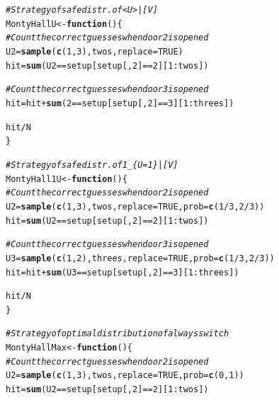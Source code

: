 \documentclass{article}\usepackage[]{graphicx}\usepackage[]{color}
\makeatletter
\newcommand{\hlnum}[1]{\textcolor[rgb]{0.686,0.059,0.569}{#1}}%
\newcommand{\hlcom}[1]{\textcolor[rgb]{0.678,0.584,0.686}{\textit{#1}}}%
\newcommand{\hlopt}[1]{\textcolor[rgb]{0,0,0}{#1}}%
\newcommand{\hlstd}[1]{\textcolor[rgb]{0.345,0.345,0.345}{#1}}%
\newcommand{\hlkwa}[1]{\textcolor[rgb]{0.161,0.373,0.58}{\textbf{#1}}}%
\newcommand{\hlkwb}[1]{\textcolor[rgb]{0.69,0.353,0.396}{#1}}%
\newcommand{\hlkwc}[1]{\textcolor[rgb]{0.333,0.667,0.333}{#1}}%
\newcommand{\hlkwd}[1]{\textcolor[rgb]{0.737,0.353,0.396}{\textbf{#1}}}%
\newenvironment{kframe}{%
 \def\at@end@of@kframe{}%
 \ifinner\ifhmode%
  \def\at@end@of@kframe{\end{minipage}}%
  \begin{minipage}{\columnwidth}%
 \fi\fi%
 \def\FrameCommand##1{\hskip\@totalleftmargin \hskip-\fboxsep
 \colorbox{shadecolor}{##1}\hskip-\fboxsep
     \hskip-\linewidth \hskip-\@totalleftmargin \hskip\columnwidth}%
 \MakeFramed {\advance\hsize-\width
   \@totalleftmargin\z@ \linewidth\hsize
   \@setminipage}}%
 {\par\unskip\endMakeFramed%
 \at@end@of@kframe}
\newenvironment{knitrout}{}{} %
\makeatother
\begin{document}
\begin{knitrout}
\color{fgcolor}\begin{kframe}
\begin{alltt}
\hlcom{# Strategy of safe distr. of <U>|[V]}
\hlstd{MontyHallU} \hlkwb{<-} \hlkwa{function} \hlstd{() \{}
  \hlcom{# Count the correct guesses when door 2 is opened}
  \hlstd{U2} \hlkwb{=} \hlkwd{sample}\hlstd{(}\hlkwd{c}\hlstd{(}\hlnum{1}\hlstd{,}\hlnum{3}\hlstd{), twos,} \hlkwc{replace} \hlstd{=} \hlnum{TRUE}\hlstd{)}
  \hlstd{hit} \hlkwb{=} \hlkwd{sum}\hlstd{(U2} \hlopt{==} \hlstd{setup[setup[,}\hlnum{2}\hlstd{]} \hlopt{==} \hlnum{2}\hlstd{][}\hlnum{1}\hlopt{:}\hlstd{twos])}

  \hlcom{# Count the correct guesses when door 3 is opened}
  \hlstd{hit} \hlkwb{=} \hlstd{hit} \hlopt{+} \hlkwd{sum}\hlstd{(}\hlnum{2} \hlopt{==} \hlstd{setup[setup[,}\hlnum{2}\hlstd{]} \hlopt{==} \hlnum{3}\hlstd{][}\hlnum{1}\hlopt{:}\hlstd{threes])}

  \hlstd{hit}\hlopt{/}\hlstd{N}
\hlstd{\}}

\hlcom{# Strategy of safe distr. of 1_\{U=1\}|[V]}
\hlstd{MontyHall1U} \hlkwb{<-} \hlkwa{function}\hlstd{() \{}
  \hlcom{# Count the correct guesses when door 2 is opened}
  \hlstd{U2} \hlkwb{=} \hlkwd{sample}\hlstd{(}\hlkwd{c}\hlstd{(}\hlnum{1}\hlstd{,}\hlnum{3}\hlstd{), twos,} \hlkwc{replace} \hlstd{=} \hlnum{TRUE}\hlstd{,} \hlkwc{prob} \hlstd{=} \hlkwd{c}\hlstd{(}\hlnum{1}\hlopt{/}\hlnum{3}\hlstd{,}\hlnum{2}\hlopt{/}\hlnum{3}\hlstd{))}
  \hlstd{hit} \hlkwb{=} \hlkwd{sum}\hlstd{(U2} \hlopt{==} \hlstd{setup[setup[,}\hlnum{2}\hlstd{]} \hlopt{==} \hlnum{2}\hlstd{][}\hlnum{1}\hlopt{:}\hlstd{twos])}

  \hlcom{# Count the correct guesses when door 3 is opened}
  \hlstd{U3} \hlkwb{=} \hlkwd{sample}\hlstd{(}\hlkwd{c}\hlstd{(}\hlnum{1}\hlstd{,}\hlnum{2}\hlstd{), threes,} \hlkwc{replace} \hlstd{=} \hlnum{TRUE}\hlstd{,} \hlkwc{prob} \hlstd{=} \hlkwd{c}\hlstd{(}\hlnum{1}\hlopt{/}\hlnum{3}\hlstd{,}\hlnum{2}\hlopt{/}\hlnum{3}\hlstd{))}
  \hlstd{hit} \hlkwb{=} \hlstd{hit} \hlopt{+} \hlkwd{sum}\hlstd{(U3} \hlopt{==} \hlstd{setup[setup[,}\hlnum{2}\hlstd{]} \hlopt{==} \hlnum{3}\hlstd{][}\hlnum{1}\hlopt{:}\hlstd{threes])}

  \hlstd{hit}\hlopt{/}\hlstd{N}
\hlstd{\}}

\hlcom{# Strategy of optimal distribution of always switch}
\hlstd{MontyHallMax} \hlkwb{<-} \hlkwa{function}\hlstd{() \{}
  \hlcom{# Count the correct guesses when door 2 is opened}
  \hlstd{U2} \hlkwb{=} \hlkwd{sample}\hlstd{(}\hlkwd{c}\hlstd{(}\hlnum{1}\hlstd{,}\hlnum{3}\hlstd{), twos,} \hlkwc{replace} \hlstd{=} \hlnum{TRUE}\hlstd{,} \hlkwc{prob} \hlstd{=} \hlkwd{c}\hlstd{(}\hlnum{0}\hlstd{,}\hlnum{1}\hlstd{))}
  \hlstd{hit} \hlkwb{=} \hlkwd{sum}\hlstd{(U2} \hlopt{==} \hlstd{setup[setup[,}\hlnum{2}\hlstd{]} \hlopt{==} \hlnum{2}\hlstd{][}\hlnum{1}\hlopt{:}\hlstd{twos])}


\end{alltt}
\end{kframe}
\end{knitrout}
\end{document}

